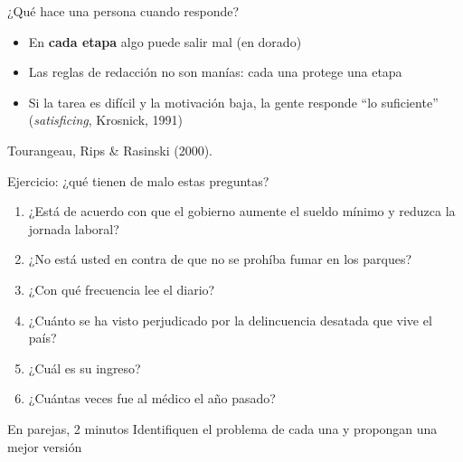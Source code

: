 \documentclass[aspectratio=169,11pt]{beamer}
\newcommand{\fuente}[1]{\par\vfill{\scriptsize\color{gris}#1\par}}
\begin{document}
\begin{frame}{¿Qué hace una persona cuando responde?}
\centering
{}
\bigskip
\begin{itemize}
  \item En \textbf{cada etapa} algo puede salir mal (en dorado)
  \item Las reglas de redacción no son manías: cada una protege una etapa
  \item Si la tarea es difícil y la motivación baja, la gente responde ``lo suficiente'' (\textit{satisficing}, Krosnick, 1991)
\end{itemize}
\fuente{Tourangeau, Rips \& Rasinski (2000).}
\end{frame}

\begin{frame}{Ejercicio: ¿qué tienen de malo estas preguntas?}
\begin{enumerate}
  \item ¿Está de acuerdo con que el gobierno aumente el sueldo mínimo y reduzca la jornada laboral?
  \item ¿No está usted en contra de que no se prohíba fumar en los parques?
  \item ¿Con qué frecuencia lee el diario? 
  \item ¿Cuánto se ha visto perjudicado por la delincuencia desatada que vive el país?
  \item ¿Cuál es su ingreso? 
  \item ¿Cuántas veces fue al médico el año pasado?
\end{enumerate}
\bigskip
\begin{block}{En parejas, 2 minutos}
\small
Identifiquen el problema de cada una y propongan una mejor versión
\end{block}
\end{frame}
\end{document}

